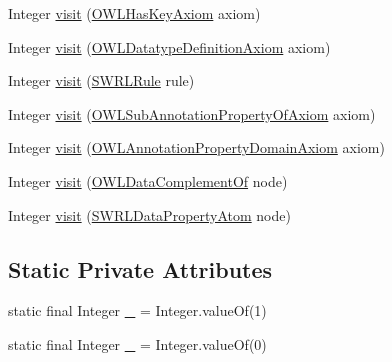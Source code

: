 \begin{DoxyCompactItemize}
\item 
Integer \hyperlink{classorg_1_1semanticweb_1_1owlapi_1_1util_1_1_maximum_modal_depth_finder_ab54f04f352a74ca5fcde5abe62db26b9}{visit} (\hyperlink{interfaceorg_1_1semanticweb_1_1owlapi_1_1model_1_1_o_w_l_has_key_axiom}{O\-W\-L\-Has\-Key\-Axiom} axiom)
\item 
Integer \hyperlink{classorg_1_1semanticweb_1_1owlapi_1_1util_1_1_maximum_modal_depth_finder_ac4e17402e151751ee6fd269f067c83d7}{visit} (\hyperlink{interfaceorg_1_1semanticweb_1_1owlapi_1_1model_1_1_o_w_l_datatype_definition_axiom}{O\-W\-L\-Datatype\-Definition\-Axiom} axiom)
\item 
Integer \hyperlink{classorg_1_1semanticweb_1_1owlapi_1_1util_1_1_maximum_modal_depth_finder_adf72aa4fe5caa1f7a0e741aee6f20e71}{visit} (\hyperlink{interfaceorg_1_1semanticweb_1_1owlapi_1_1model_1_1_s_w_r_l_rule}{S\-W\-R\-L\-Rule} rule)
\item 
Integer \hyperlink{classorg_1_1semanticweb_1_1owlapi_1_1util_1_1_maximum_modal_depth_finder_a08687b7151f05e1daf5c5164190b1745}{visit} (\hyperlink{interfaceorg_1_1semanticweb_1_1owlapi_1_1model_1_1_o_w_l_sub_annotation_property_of_axiom}{O\-W\-L\-Sub\-Annotation\-Property\-Of\-Axiom} axiom)
\item 
Integer \hyperlink{classorg_1_1semanticweb_1_1owlapi_1_1util_1_1_maximum_modal_depth_finder_a2c18f219f5c7671d6305388ab60c6bcb}{visit} (\hyperlink{interfaceorg_1_1semanticweb_1_1owlapi_1_1model_1_1_o_w_l_annotation_property_domain_axiom}{O\-W\-L\-Annotation\-Property\-Domain\-Axiom} axiom)
\item 
Integer \hyperlink{classorg_1_1semanticweb_1_1owlapi_1_1util_1_1_maximum_modal_depth_finder_a4c6f7cdb8fdd650966d225a1ec6d6f7b}{visit} (\hyperlink{interfaceorg_1_1semanticweb_1_1owlapi_1_1model_1_1_o_w_l_data_complement_of}{O\-W\-L\-Data\-Complement\-Of} node)
\item 
Integer \hyperlink{classorg_1_1semanticweb_1_1owlapi_1_1util_1_1_maximum_modal_depth_finder_a81523e78e66c24e5b1603d8f31753ecb}{visit} (\hyperlink{interfaceorg_1_1semanticweb_1_1owlapi_1_1model_1_1_s_w_r_l_data_property_atom}{S\-W\-R\-L\-Data\-Property\-Atom} node)
\end{DoxyCompactItemize}
\subsection*{Static Private Attributes}
\begin{DoxyCompactItemize}
\item 
static final Integer \hyperlink{classorg_1_1semanticweb_1_1owlapi_1_1util_1_1_maximum_modal_depth_finder_ae077cdde0e71c6eb1aa1af1775d862e5}{\-\_} = Integer.\-value\-Of(1)
\item 
static final Integer \hyperlink{classorg_1_1semanticweb_1_1owlapi_1_1util_1_1_maximum_modal_depth_finder_a22777a6dab92305b22c5e07df46f55e9}{\-\_} = Integer.\-value\-Of(0)
\end{DoxyCompactItemize}


